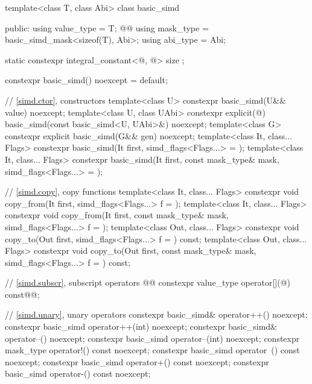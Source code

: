 \begin{codeblock}
template<class T, class Abi> class basic_simd {
public:
  using value_type = T;
  @@
  using mask_type = basic_simd_mask<sizeof(T), Abi>;
  using abi_type = Abi;

  static constexpr integral_constant<@\simdsizetype@, @> size {};

  constexpr basic_simd() noexcept = default;

  // \ref{simd.ctor},  constructors
  template<class U> constexpr basic_simd(U&& value) noexcept;
  template<class U, class UAbi>
    constexpr explicit(@\seebelow@) basic_simd(const basic_simd<U, UAbi>&) noexcept;
  template<class G> constexpr explicit basic_simd(G&& gen) noexcept;
  template<class It, class... Flags>
    constexpr basic_simd(It first, simd_flags<Flags...> = {});
  template<class It, class... Flags>
    constexpr basic_simd(It first, const mask_type& mask, simd_flags<Flags...> = {});

  // \ref{simd.copy},  copy functions
  template<class It, class... Flags>
    constexpr void copy_from(It first, simd_flags<Flags...> f = {});
  template<class It, class... Flags>
    constexpr void copy_from(It first, const mask_type& mask, simd_flags<Flags...> f = {});
  template<class Out, class... Flags>
    constexpr void copy_to(Out first, simd_flags<Flags...> f = {}) const;
  template<class Out, class... Flags>
    constexpr void copy_to(Out first, const mask_type& mask, simd_flags<Flags...> f = {}) const;

  // \ref{simd.subscr},  subscript operators
  @@
  constexpr value_type operator[](@\simdsizetype@) const@\wgRem{\&}@;

  // \ref{simd.unary},  unary operators
  constexpr basic_simd& operator++() noexcept;
  constexpr basic_simd operator++(int) noexcept;
  constexpr basic_simd& operator--() noexcept;
  constexpr basic_simd operator--(int) noexcept;
  constexpr mask_type operator!() const noexcept;
  constexpr basic_simd operator~() const noexcept;
  constexpr basic_simd operator+() const noexcept;
  constexpr basic_simd operator-() const noexcept;

}
\end{codeblock}
